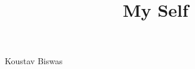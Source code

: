 \documentclass{article}
\title{My Self}
\begin{document}
	
	\maketitle
	
	Koustav Biswas
	
\end{document}
